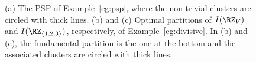 \begin{figure}
	\begin{center}
%			
	\end{center}
	\caption{
		(a) The PSP of Example~\ref{eg:psp}, where the non-trivial clusters are circled with thick lines.  
		(b) and (c) Optimal partitions of $I(\RZ_V)$ and  $I(\RZ_{\Set{1,2,3}})$, respectively, of
		Example~\ref{eg:divisive}. In (b) and (c), the
		fundamental partition is the one at the bottom and the associated clusters are circled with
		thick lines.
	}
\label{fig:eg-div}
\end{figure}
